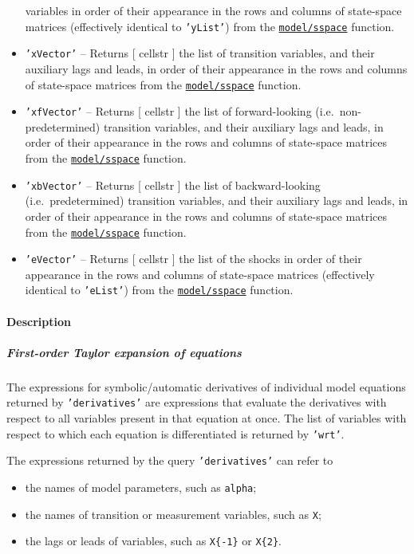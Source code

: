 \begin{itemize}
  variables in order of their appearance in the rows and columns of
  state-space matrices (effectively identical to \texttt{'yList'}) from
  the \href{model/sspace}{\texttt{model/sspace}} function.
\item
  \texttt{'xVector'} -- Returns {[} cellstr {]} the list of transition
  variables, and their auxiliary lags and leads, in order of their
  appearance in the rows and columns of state-space matrices from the
  \href{model/sspace}{\texttt{model/sspace}} function.
\item
  \texttt{'xfVector'} -- Returns {[} cellstr {]} the list of
  forward-looking (i.e.~non-predetermined) transition variables, and
  their auxiliary lags and leads, in order of their appearance in the
  rows and columns of state-space matrices from the
  \href{model/sspace}{\texttt{model/sspace}} function.
\item
  \texttt{'xbVector'} -- Returns {[} cellstr {]} the list of
  backward-looking (i.e.~predetermined) transition variables, and their
  auxiliary lags and leads, in order of their appearance in the rows and
  columns of state-space matrices from the
  \href{model/sspace}{\texttt{model/sspace}} function.
\item
  \texttt{'eVector'} -- Returns {[} cellstr {]} the list of the shocks
  in order of their appearance in the rows and columns of state-space
  matrices (effectively identical to \texttt{'eList'}) from the
  \href{model/sspace}{\texttt{model/sspace}} function.
\end{itemize}

\paragraph{Description}\label{description}

\subparagraph{First-order Taylor expansion of
equations}\label{first-order-taylor-expansion-of-equations-1}

The expressions for symbolic/automatic derivatives of individual model
equations returned by \texttt{'derivatives'} are expressions that
evaluate the derivatives with respect to all variables present in that
equation at once. The list of variables with respect to which each
equation is differentiated is returned by \texttt{'wrt'}.

The expressions returned by the query \texttt{'derivatives'} can refer
to

\begin{itemize}
\itemsep1pt\parskip0pt
\item
  the names of model parameters, such as \texttt{alpha};
\item
  the names of transition or measurement variables, such as \texttt{X};
\item
  the lags or leads of variables, such as \texttt{X\{-1\}} or
  \texttt{X\{2\}}.
\end{itemize}


